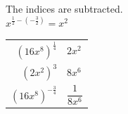 \documentclass[aspectratio=169]{beamer}
\makeatletter
\newcommand{\work}[1]{%
  \begin{tabular}{@{}r@{\;=\;}l@{}}#1\end{tabular}%
}
\makeatother
\begin{document}
  {The indices are subtracted.\\[0.3em]
   $x^{\frac{1}{2}-\left(-\frac{3}{2}\right)}=x^{2}$}

  {\work{$\left(16x^{8}\right)^{\frac{1}{4}}$ & $2x^{2}$\\[0.4em]
         $\left(2x^{2}\right)^{3}$ & $8x^{6}$\\[0.4em]
         $\left(16x^{8}\right)^{-\frac{3}{4}}$ & $\dfrac{1}{8x^{6}}$}}
\end{document}
